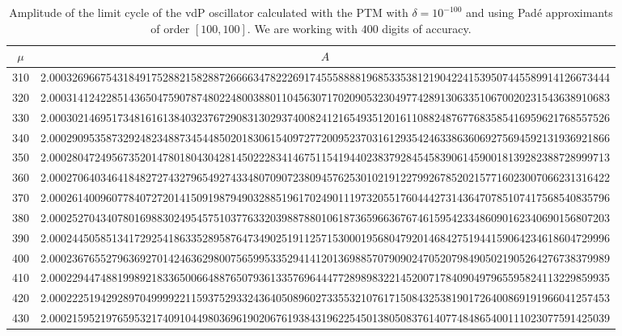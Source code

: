 \documentclass[final]{article}
\begin{document}
\begin{table}
	\caption{Amplitude of the limit cycle of the vdP oscillator calculated with the PTM with $\delta=10^{-100}$ and using Pad\'e approximants of order $[100,100]$. We are working with $400$ digits of accuracy. }
	\bigskip
	\label{table_A_vdP3}
	\begin{center}
		\begin{tabular}{|c|c|}
			\hline
			$\mu$ &   $A$    \\
			\hline
			310 &  2.000326966754318491752882158288726666347822269174555888819685335381219042241539507445589914126673444 \\
			320 &  2.000314124228514365047590787480224800388011045630717020905323049774289130633510670020231543638910683 \\
			330 &  2.000302146951734816161384032376729083130293740082412165493512016110882487677683585416959621768557526 \\
			340 &  2.000290953587329248234887345448502018306154097277200952370316129354246338636069275694592131936921866 \\
			350 &  2.000280472495673520147801804304281450222834146751154194402383792845458390614590018139282388728999713 \\
			360 &  2.000270640346418482727432796549274334807090723809457625301021912279926785202157716023007066231316422 \\
			370 &  2.000261400960778407272014150919879490328851961702490111973205517604442731436470785107417568540835796 \\
			380 &  2.000252704340780169883024954575103776332039887880106187365966367674615954233486090162340690156807203 \\
			390 &  2.000244505851341729254186335289587647349025191125715300019568047920146842751944159064234618604729996 \\
			400 &  2.000236765527963692701424636298007565995335294141201369885707909024705207984905021905264276738379989 \\
			410 &  2.000229447488199892183365006648876507936133576964447728989832214520071784090497965595824113229859935 \\
			420 &   2.000222519429289704999922115937529332436405089602733553210761715084325381901726400869191966041257453 \\
			430  &  2.000215952197659532174091044980369619020676193843196225450138050837614077484865400111023077591425039 \\

\end{tabular}
\end{center}
\end{table}
\end{document}
